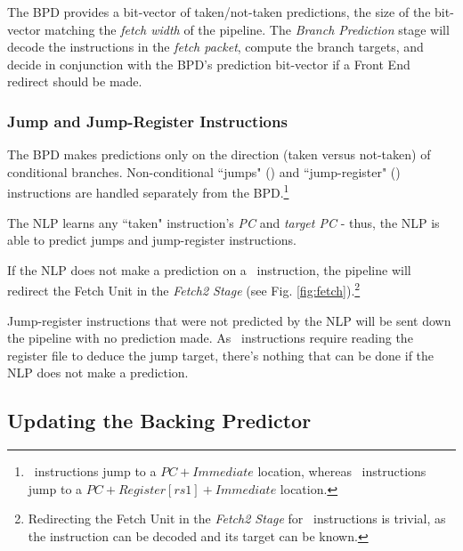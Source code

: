 The BPD provides a bit-vector of taken/not-taken predictions, the size of the bit-vector matching the {\em fetch width} of the pipeline. The {\em Branch Prediction} stage will decode the instructions in the {\em fetch packet}, compute the branch targets, and decide in conjunction with the BPD's prediction bit-vector if a Front End redirect should be made. 

\subsubsection{Jump and Jump-Register Instructions}

The BPD makes predictions only on the direction (taken versus not-taken) of conditional branches.  Non-conditional ``jumps" (\jal) and ``jump-register" (\jalr) instructions are handled separately from the BPD.\footnote{\jal\ instructions jump to a $PC+Immediate$ location, whereas \jalr\ instructions jump to a $PC+Register[rs1]+Immediate$ location.}

The NLP learns any ``taken" instruction's {\em PC} and {\em target PC} - thus, the NLP is able to predict jumps and jump-register instructions.

If the NLP does not make a prediction on a \jal\ instruction, the pipeline will redirect the Fetch Unit in the {\em Fetch2 Stage} (see Fig. \ref{fig:fetch}).\footnote{Redirecting the Fetch Unit in the {\em Fetch2 Stage} for \jal\ instructions is trivial, as the instruction can be decoded and its target can be known.}

Jump-register instructions that were not predicted by the NLP will be sent down the pipeline with no prediction made.  As \jalr\ instructions require reading the register file to deduce the jump target, there's nothing that can be done if the NLP does not make a prediction.


\subsection{Updating the Backing Predictor}

